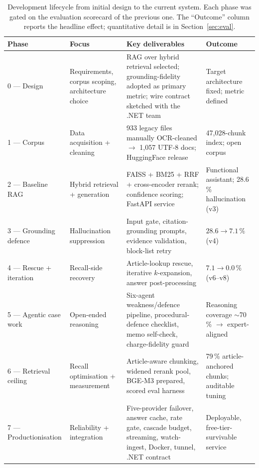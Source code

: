 \documentclass[final,1p,times]{elsarticle}
\newcommand{\thead}[1]{\textbf{#1}}                 %
\begin{document}
\begin{table}[!htb]
\centering
\small
\caption{Development lifecycle from initial design to the current system. Each
phase was gated on the evaluation scorecard of the previous one. The
``Outcome'' column reports the headline effect; quantitative detail is in
Section~\ref{sec:eval}.}
\label{tab:lifecycle}
\setlength{\tabcolsep}{5pt}
\renewcommand{\arraystretch}{1.25}
\begin{tabular}{p{1.6cm} L{3.4cm} L{5.6cm} L{4.1cm}}
\toprule
{}
\thead{Phase} & \thead{Focus} & \thead{Key deliverables} & \thead{Outcome} \\
 --- Design &
Requirements, corpus scoping, architecture choice &
RAG over hybrid retrieval selected; grounding-fidelity adopted as primary metric; wire contract sketched with the .NET team &
Target architecture fixed; metric defined \\
1 --- Corpus &
Data acquisition + cleaning &
933 legacy files manually OCR-cleaned $\rightarrow$ 1{,}057 UTF-8 docs; HuggingFace release &
47{,}028-chunk index; open corpus \\
2 --- Baseline RAG &
Hybrid retrieval + generation &
FAISS + BM25 + RRF + cross-encoder rerank; confidence scoring; FastAPI service &
Functional assistant; 28.6\,\% hallucination (v3) \\
3 --- Grounding defence &
Hallucination suppression &
Input gate, citation-grounding prompts, evidence validation, block-list retry &
$28.6 \rightarrow 7.1\,\%$ (v4) \\
4 --- Rescue + iteration &
Recall-side recovery &
Article-lookup rescue, iterative $k$-expansion, answer post-processing &
$7.1 \rightarrow 0.0\,\%$ (v6--v8) \\
5 --- Agentic case work &
Open-ended reasoning &
Six-agent weakness/defence pipeline, procedural-defence checklist, memo self-check, charge-fidelity guard &
Reasoning coverage $\sim$70\,\% $\rightarrow$ expert-aligned \\
6 --- Retrieval ceiling &
Recall optimisation + measurement &
Article-aware chunking, widened rerank pool, BGE-M3 prepared, scored eval harness &
79\,\% article-anchored chunks; auditable tuning \\
7 --- Productionisation &
Reliability + integration &
Five-provider failover, answer cache, rate gate, cascade budget, streaming, watch-ingest, Docker, tunnel, .NET contract &
Deployable, free-tier-survivable service \\
\bottomrule
\end{tabular}
\end{table}
\end{document}
